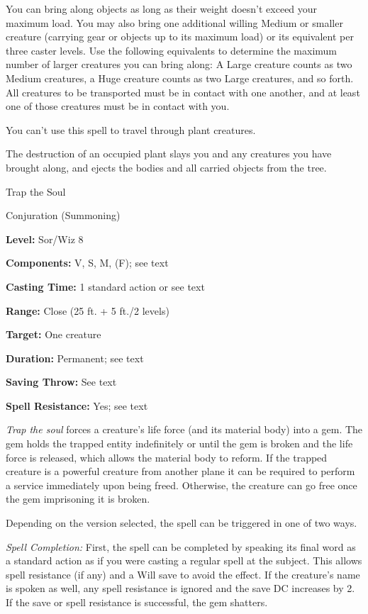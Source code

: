 \documentclass{article}
\begin{document}
You can bring along objects as long as their weight doesn't exceed your maximum 
load. You may also bring one additional willing Medium or smaller creature (carrying 
gear or objects up to its maximum load) or its equivalent per three caster levels. 
Use the following equivalents to determine the maximum number of larger creatures 
you can bring along: A Large creature counts as two Medium creatures, a Huge creature 
counts as two Large creatures, and so forth. All creatures to be transported must 
be in contact with one another, and at least one of those creatures must be in 
contact with you.

You can't use this spell to travel through plant creatures.

The destruction of an occupied plant slays you and any creatures you have brought 
along, and ejects the bodies and all carried objects from the tree.

\vspace{12pt}
Trap the Soul

Conjuration (Summoning)

\textbf{Level:} Sor/Wiz 8

\textbf{Components:} V, S, M, (F); see text

\textbf{Casting Time:} 1 standard action or see text

\textbf{Range:} Close (25 ft. + 5 ft./2 levels)

\textbf{Target:} One creature

\textbf{Duration:} Permanent; see text

\textbf{Saving Throw:} See text

\textbf{Spell Resistance:} Yes; see text

\textit{Trap the soul }forces a creature's life force (and its material body) into 
a gem. The gem holds the trapped entity indefinitely or until the gem is broken 
and the life force is released, which allows the material body to reform. If the 
trapped creature is a powerful creature from another plane it can be required to 
perform a service immediately upon being freed. Otherwise, the creature can go 
free once the gem imprisoning it is broken.

Depending on the version selected, the spell can be triggered in one of two ways.

\textit{Spell Completion: }First, the spell can be completed by speaking its final 
word as a standard action as if you were casting a regular spell at the subject. 
This allows spell resistance (if any) and a Will save to avoid the effect. If the 
creature's name is spoken as well, any spell resistance is ignored and the save 
DC increases by 2. If the save or spell resistance is successful, the gem shatters.
\end{document}
